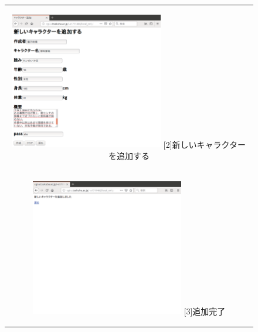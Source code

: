 \documentclass[12pt,a4paper]{jarticle}
\begin{document}
\begin{ttfamily}
\begin{figure}[htbp]
\begin{center}
\begin{tabular}{c}
      \begin{minipage}{0.55\hsize}
        \begin{center}
          \includegraphics[width=6.7cm]{10-3-22.eps}
          \hspace{1.6cm} [2]新しいキャラクターを追加する
        \end{center}
      \end{minipage}

      \begin{minipage}{0.55\hsize}
        \vspace{30mm}
      \end{minipage} \\
 
      \begin{minipage}{0.5\hsize}
        \begin{center}
          \includegraphics[width=6.7cm]{10-3-23.eps}
          \hspace{1.6cm} [3]追加完了
        \end{center}
      \end{minipage}


\end{tabular}
\end{center}
\end{figure}
\end{ttfamily}
\end{document}
